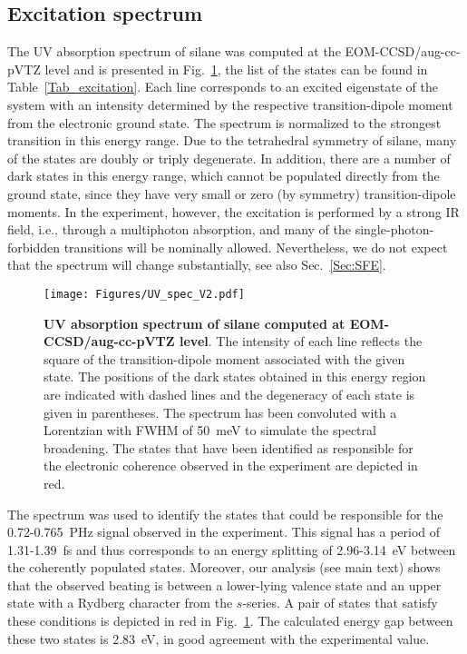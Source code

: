 \documentclass[12pt]{article}
\begin{document}
\subsection{Excitation spectrum}

The UV absorption spectrum of silane was computed at the EOM-CCSD/aug-cc-pVTZ level and is presented in Fig.~\ref{UVspec}, the list of the states can be found in Table~\ref{Tab_excitation}. Each line corresponds to an excited eigenstate of the system with an intensity determined by the respective transition-dipole moment from the electronic ground state. The spectrum is normalized to the strongest transition in this energy range. Due to the tetrahedral symmetry of silane, many of the states are doubly or triply degenerate. In addition, there are a number of dark states in this energy range, which cannot be populated directly from the ground state, since they have very small or zero (by symmetry) transition-dipole moments. In the experiment, however, the excitation is performed by a strong IR field, i.e., through a multiphoton absorption, and many of the single-photon-forbidden transitions will be nominally allowed. Nevertheless, we do not expect that the spectrum will change substantially, see also Sec.~\ref{Sec:SFE}. 

\begin{figure}
\begin{center}
\texttt{[image: Figures/UV\_spec\_V2.pdf]}
\end{center}
\caption{\label{UVspec}\textbf{UV absorption spectrum of silane computed at EOM-CCSD/aug-cc-pVTZ level}. The intensity of each line reflects the square of the transition-dipole moment associated with the given state. The positions of the dark states obtained in this energy region are indicated with dashed lines and the degeneracy of each state is given in parentheses. The spectrum has been convoluted with a Lorentzian with FWHM of 50~meV to simulate the spectral broadening. The states that have been identified as responsible for the electronic coherence observed in the experiment are depicted in red.}
\end{figure}

The spectrum was used to identify the states that could be responsible for the 0.72-0.765~PHz signal observed in the experiment. This signal has a period of 1.31-1.39~fs and thus corresponds to an energy splitting of 2.96-3.14~eV between the coherently populated states. Moreover, our analysis (see main text) shows that the observed beating is between a lower-lying valence state and an upper state with a Rydberg character from the $s$-series. A pair of states that satisfy these conditions is depicted in red in Fig.~\ref{UVspec}. The calculated energy gap between these two states is 2.83~eV, in good agreement with the experimental value. 
\end{document}
